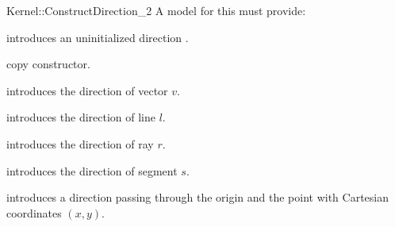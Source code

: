 \begin{ccRefFunctionObjectConcept}{Kernel::ConstructDirection_2}
A model for this must provide:



\ccHidden {}
             {introduces an uninitialized direction .}

\ccHidden {}
            {copy constructor.}

            {introduces the direction of vector $v$.}

            {introduces the direction of line $l$.}

            {introduces the direction of ray $r$.}

            {introduces the direction of segment $s$.}

\ccHidden{}
            {introduces a direction  passing through the origin
             and the point with Cartesian coordinates $(x, y)$.}

\ccSeeAlso

  \\

\end{ccRefFunctionObjectConcept}

